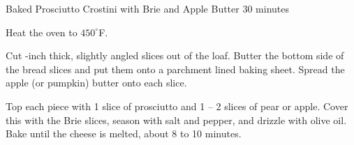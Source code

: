 \documentclass[a4paper]{article}
\begin{document}
\begin{recipe}
  {Baked Prosciutto Crostini with Brie and Apple Butter}
  {}
  {30 minutes}



Heat the oven to $450^\circ$F.

\medskip

Cut -inch thick, slightly angled slices out of the loaf.
Butter the bottom side of the bread slices and put them onto a parchment lined
baking sheet.
Spread the apple (or pumpkin) butter onto each slice.

\medskip

Top each piece with 1 slice of prosciutto and 1 -- 2 slices of pear or
apple.
Cover this with the Brie slices, season with salt and pepper, and drizzle with
olive oil.
Bake until the cheese is melted, about 8 to 10 minutes.

\end{recipe}
\end{document}

